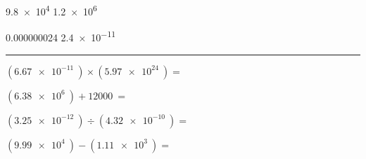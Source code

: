 \documentclass[12pt]{exam}
\begin{document}
\begin{questions}
\begin{multicols}{2}
      \vspace{1em}

    \question
      \begin{oneparcheckboxes}
        \choice \SI{9.8e4}{}
        \choice \SI{1.2e6}{}
      \end{oneparcheckboxes}

      \vspace{1em}

    \question
      \begin{oneparcheckboxes}
        \choice \SI{0.000000024}{}
        \choice \SI{2.4e-11}{}
      \end{oneparcheckboxes}

      \vspace{1em}

  \end{multicols}

  \vs
  \hrule



  \begin{multicols}{2}

    \question
      $
      \left( \SI{6.67e-11}{} \right) \times 
      \left( \SI{5.97e24}{} \right) =
      $
      \vspace{3em}

    \question
      $
      \left( \SI{6.38e6}{} \right) + \SI{12000}{} =
      $
      \vspace{3em}

    \question
      $
      \left( \SI{3.25e-12}{} \right) \div 
      \left( \SI{4.32e-10}{} \right) =
      $
      \vspace{3em}

    \question
      $
      \left( \SI{9.99e4}{} \right) - 
      \left( \SI{1.11e3}{} \right) =
      $
      \vspace{3em}

  \end{multicols}

  \vs



\end{questions}
\end{document}
